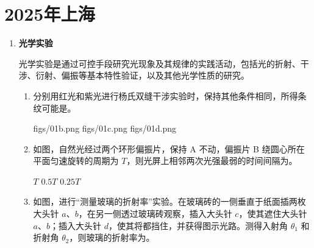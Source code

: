 \documentclass[\gkver]{gaokaozhenti}
\begin{document}
\chapter{2025年上海}

\begin{enumerate}
\item
\textbf{光学实验}

光学实验是通过可控手段研究光现象及其规律的实践活动，包括光的折射、干涉、衍射、偏振等基本特性验证，以及其他光学性质的研究。
\begin{enumerate}
	\item
	分别用红光和紫光进行杨氏双缝干涉实验时，保持其他条件相同，所得条纹可能是。

	{figs/01b.png}
	{figs/01c.png}
	{figs/01d.png}

	\item
	如图，自然光经过两个环形偏振片，保持 A 不动，偏振片 B 绕圆心所在平面匀速旋转的周期为 $T$，则光屏上相邻两次光强最弱的时间间隔为。

	\onepicture[align=right, w=4.18cm]{}

	{$T$}
	{$0.5T$}
	{$0.25T$}

	\item
	如图，进行“测量玻璃的折射率”实验。在玻璃砖的一侧垂直于纸面插两枚大头针 $a$、$b$，在另一侧透过玻璃砖观察，插入大头针 $c$，使其遮住大头针 $a$、$b$；插入大头针 $d$，使其将都挡住，并获得图示光路。测得入射角 $\theta_{1}$ 和折射角 $\theta_{2}$，则玻璃的折射率为。

	\onepicture[align=right, w=3.90cm]{}
\end{enumerate}
\end{enumerate}
\end{document}

